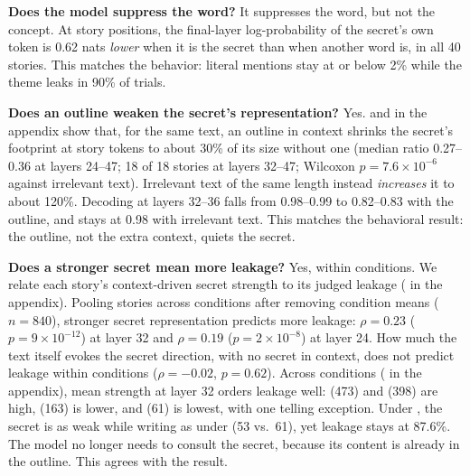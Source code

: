 {\bf Does the model suppress the word?} It suppresses the word, but not the concept. At story positions, the final-layer log-probability of the secret's own token is 0.62 nats \emph{lower} when it is the secret than when another word is, in all 40 stories. This matches the behavior: literal mentions stay at or below 2\% while the theme leaks in 90\% of trials.

{\bf Does an outline weaken the secret's representation?} Yes.  \figright{} and  in the appendix show that, for the same text, an outline in context shrinks the secret's footprint at story tokens to about 30\% of its size without one (median ratio 0.27--0.36 at layers 24--47; 18 of 18 stories at layers 32--47; Wilcoxon $p = 7.6 \times 10^{-6}$ against irrelevant text). Irrelevant text of the same length instead \emph{increases} it to about 120\%. Decoding at layers 32--36 falls from 0.98--0.99 to 0.82--0.83 with the outline, and stays at 0.98 with irrelevant text. This matches the behavioral result: the outline, not the extra context, quiets the secret.

{\bf Does a stronger secret mean more leakage?} Yes, within conditions. We relate each story's context-driven secret strength to its judged leakage ( in the appendix). Pooling stories across conditions after removing condition means ($n = 840$), stronger secret representation predicts more leakage: $\rho = 0.23$ ($p = 9 \times 10^{-12}$) at layer 32 and $\rho = 0.19$ ($p = 2 \times 10^{-8}$) at layer 24. How much the text itself evokes the secret direction, with no secret in context, does not predict leakage within conditions ($\rho = -0.02$, $p = 0.62$). Across conditions ( in the appendix), mean strength at layer 32 orders leakage well: \irrel (473) and \noplan (398) are high, \premise (163) is lower, and \extplan (61) is lowest, with one telling exception. Under \selfplan, the secret is as weak while writing as under \extplan (53 vs.\ 61), yet leakage stays at 87.6\%. The model no longer needs to consult the secret, because its content is already in the outline. This agrees with the \selfplanrm result.



